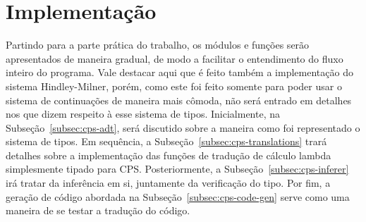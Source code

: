 \section{Implementação}\label{sec:implementacao}

Partindo para a parte prática do trabalho, os módulos e funções serão apresentados de maneira gradual, de modo a facilitar o entendimento do fluxo inteiro do programa.
Vale destacar aqui que é feito também a implementação do sistema Hindley-Milner, porém, como este foi feito somente para poder usar o sistema de continuações de maneira mais cômoda, não será entrado em detalhes nos que dizem respeito à esse sistema de tipos.
Inicialmente, na Subseção~\ref{subsec:cps-adt}, será discutido sobre a maneira como foi representado o sistema de tipos.
Em sequência, a Subseção~\ref{subsec:cps-translations} trará detalhes sobre a implementação das funções de tradução de cálculo lambda simplesmente tipado para CPS.
Posteriormente, a Subseção~\ref{subsec:cps-inferer} irá tratar da inferência em si, juntamente da verificação do tipo.
Por fim, a geração de código abordada na Subseção~\ref{subsec:cps-code-gen} serve como uma maneira de se testar a tradução do código.






